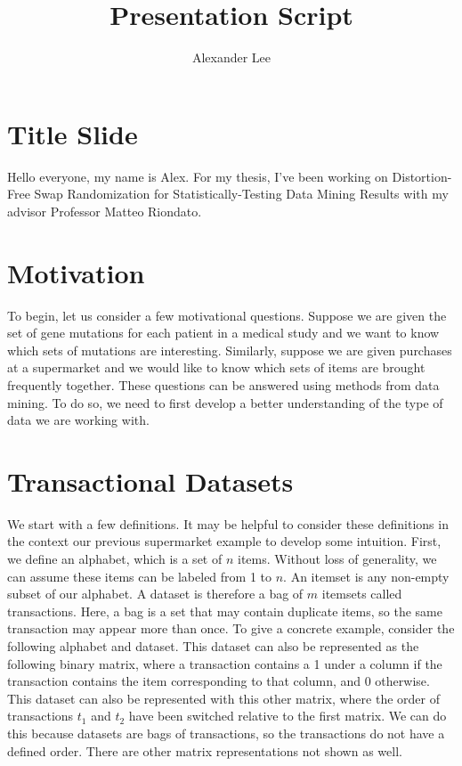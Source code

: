 \documentclass{article}
\title{Presentation Script}
\author{Alexander Lee}
\begin{document}
\maketitle

\section*{Title Slide}

Hello everyone, my name is Alex. For my thesis, I've been working on
Distortion-Free Swap Randomization for Statistically-Testing Data Mining
Results with my advisor Professor Matteo Riondato.

\section*{Motivation}

To begin, let us consider a few motivational questions. Suppose we are given the
set of gene mutations for each patient in a medical study and we want to know
which sets of mutations are interesting. Similarly, suppose we are given
purchases at a supermarket and we would like to know which sets of items are
brought frequently together. These questions can be answered using methods from
data mining. To do so, we need to first develop a better understanding of the
type of data we are working with.

\section*{Transactional Datasets}

We start with a few definitions. It may be helpful to consider these definitions
in the context our previous supermarket example to develop some intuition.
First, we define an alphabet, which is a set of $n$ items. Without loss of
generality, we can assume these items can be labeled from 1 to $n$. An itemset
is any non-empty subset of our alphabet. A dataset is therefore a bag of $m$
itemsets called transactions. Here, a bag is a set that may contain duplicate
items, so the same transaction may appear more than once. To give a concrete
example, consider the following alphabet and dataset. This dataset can also be
represented as the following binary matrix, where a transaction contains a 1
under a column if the transaction contains the item corresponding to that
column, and 0 otherwise. This dataset can also be represented with this other
matrix, where the order of transactions $t_1$ and $t_2$ have been switched
relative to the first matrix. We can do this because datasets are bags of
transactions, so the transactions do not have a defined order. There are other
matrix representations not shown as well.
\end{document}
